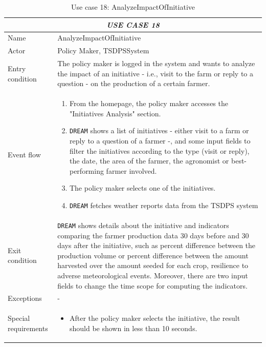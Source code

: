 \documentclass{article}
\begin{document}
\centering
\begin{longtable}{|p{3.5cm}|m{8cm}|}
\caption{Use case 18: AnalyzeImpactOfInitiative}
 \label{uc18}
 \hline
 \multicolumn{2}{|c|}{\cellcolor{white}\emph{USE CASE 18}} \\
 \endfirsthead
 \endhead
 \endfoot
 \endlastfoot
 \hline
 Name & AnalyzeImpactOfInitiative\\
 \hline
 Actor & Policy Maker, TSDPSSystem\\
 \hline
 Entry condition & The policy maker is logged in the system and wants to analyze the impact of an initiative - i.e., visit to the farm or reply to a question - on the production of a certain farmer.\\
 \hline
 Event flow & \begin{enumerate}
    \item From the homepage, the policy maker accesses the "Initiatives Analysis" section.
    \item \verb|DREAM| shows a list of initiatives - either visit to a farm or reply to a question of a farmer -, and some input fields to filter the initiatives according to the type (visit or reply), the date, the area of the farmer, the agronomist or best-performing farmer involved.
    \item The policy maker selects one of the initiatives.
    \item \verb|DREAM| fetches weather reports data from the TSDPS system
 \end{enumerate}\\
 \hline
 Exit condition &  \verb|DREAM| shows details about the initiative and indicators comparing the farmer production data 30 days before and 30 days after the initiative, such as percent difference between the production volume or percent difference between the amount harvested over the amount seeded for each crop, resilience to adverse meteorological events. Moreover, there are two input fields to change the time scope for computing the indicators.\\
 \hline
 Exceptions & -\\
 \hline
 Special requirements &\begin{itemize}
     \item After the policy maker selects the initiative, the result should be shown in less than 10 seconds.
 \end{itemize}\\
 \hline
\end{longtable}
\end{document}
